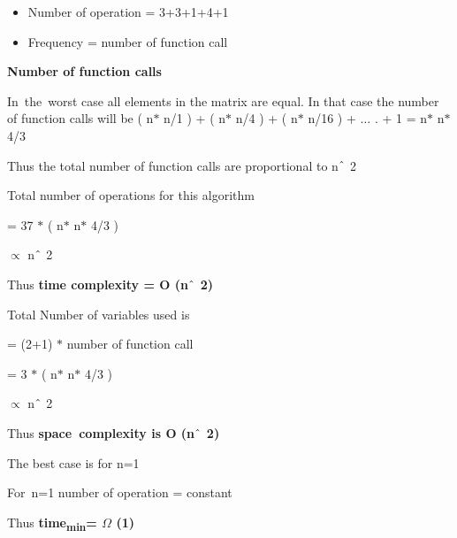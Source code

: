 \documentclass[14pt]{article}
\renewcommand{\_}{\kern-1.5pt\textunderscore\kern-1.5pt}
\begin{document}
\begin{multicols}{2}
\begin{enumerate}
\begin{itemize}
\vspace{\baselineskip}
	\item Number of operation = 3+3+1+4+1
	\item Frequency = number of function call
\end{itemize}
\begin{justify}
\textbf{Number of function calls}
\end{justify}
\begin{justify}
In\ the\ worst case all elements in the matrix are equal. In that case the number of function calls will be ( n$\ast$ n/1 ) + ( n$\ast$ n/4 ) + ( n$\ast$ n/16 ) + $ \ldots $ . + 1  =  n$\ast$ n$\ast$ 4/3
\end{justify}
\begin{justify}
Thus the total number of function calls are proportional to n$ \string^ $ 2
\end{justify}


\begin{justify}
Total number of operations for this algorithm\textbf{ }
\end{justify}
\begin{justify}
= 37 $\ast$  ( n$\ast$ n$\ast$ 4/3 )
\end{justify}
\begin{justify}
{\fontsize{12pt}{14.4pt}\selectfont $\propto$  } n$ \string^ $ 2
\end{justify}
\begin{justify}
Thus \textbf{time complexity = O (n$ \string^ $ 2)}
\end{justify}

\vspace{\baselineskip}
\begin{justify}
Total Number of variables used is
\end{justify}
\begin{justify}
= (2+1) $\ast$  number of function call
\end{justify}
\begin{justify}
= 3 $\ast$  ( n$\ast$ n$\ast$ 4/3 )
\end{justify}
\begin{justify}
{\fontsize{12pt}{14.4pt}\selectfont $\propto$  } n$ \string^ $ 2
\end{justify}
\begin{justify}
Thus \textbf{space\ complexity is  O (n$ \string^ $ 2)}
\end{justify}

\vspace{\baselineskip}
\begin{justify}
The best case is for n=1
\end{justify}
\begin{justify}
For\  n=1 number of operation = constant
\end{justify}
\begin{justify}
Thus \textbf{time\textsubscript{min}= \(  \Omega  \) (1)}
\end{justify}


\end{enumerate}
\end{multicols}
\end{document}

